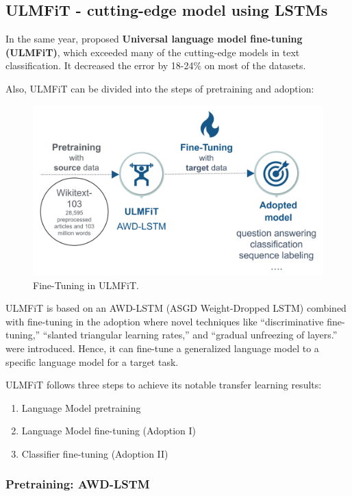 \documentclass[]{krantz}
\providecommand{\tightlist}{%
  \setlength{\itemsep}{0pt}\setlength{\parskip}{0pt}}
\begin{document}
\hypertarget{ulmfit}{%
\subsection{ULMFiT - cutting-edge model using LSTMs}\label{ulmfit}}

In the same year, \citet{howardruder2018} proposed \textbf{Universal language model fine-tuning (ULMFiT)}, which exceeded many of the cutting-edge models in text classification. It decreased the error by 18-24\% on most of the datasets.

Also, ULMFiT can be divided into the steps of pretraining and adoption:

\begin{figure}

{\centering \includegraphics[width=0.6\linewidth]{figures/02-01-transfer-learning-for-nlp-1/sequential-transfer-learning-ulmfit} 

}

\caption{Fine-Tuning in ULMFiT.}\label{fig:ch21-tl-ulmfit}
\end{figure}

ULMFiT is based on an AWD-LSTM (ASGD Weight-Dropped LSTM) combined with fine-tuning in the adoption where novel techniques like ``discriminative fine-tuning,'' ``slanted triangular learning rates,'' and ``gradual unfreezing of layers.'' were introduced. Hence, it can fine-tune a generalized language model to a specific language model for a target task.

ULMFiT follows three steps to achieve its notable transfer learning results:

\begin{enumerate}
\def\labelenumi{\arabic{enumi}.}
\tightlist
\item
  Language Model pretraining
\item
  Language Model fine-tuning (Adoption I)
\item
  Classifier fine-tuning (Adoption II)
\end{enumerate}

\hypertarget{pretraining-awd-lstm}{%
\subsubsection{Pretraining: AWD-LSTM}\label{pretraining-awd-lstm}}
\end{document}
